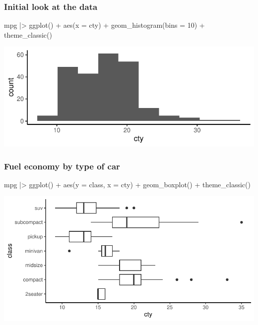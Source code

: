 \documentclass[a4paper]{article}
\begin{document}
\subsubsection{Initial look at the data}
\begin{Schunk}
\begin{Sinput}
mpg |> ggplot() + 
  aes(x = cty) + 
  geom_histogram(bins = 10) +
  theme_classic()
\end{Sinput}


{\centering \includegraphics[width=\maxwidth]{figure/listings-unnamed-chunk-373-1} 

}

\end{Schunk}
\subsubsection{Fuel economy by type of car}
\begin{Schunk}
\begin{Sinput}
mpg |> ggplot() + 
  aes(y = class, x = cty) + 
  geom_boxplot() +
  theme_classic()
\end{Sinput}


{\centering \includegraphics[width=\maxwidth]{figure/listings-unnamed-chunk-374-1} 

}

\end{Schunk}
\end{document}
